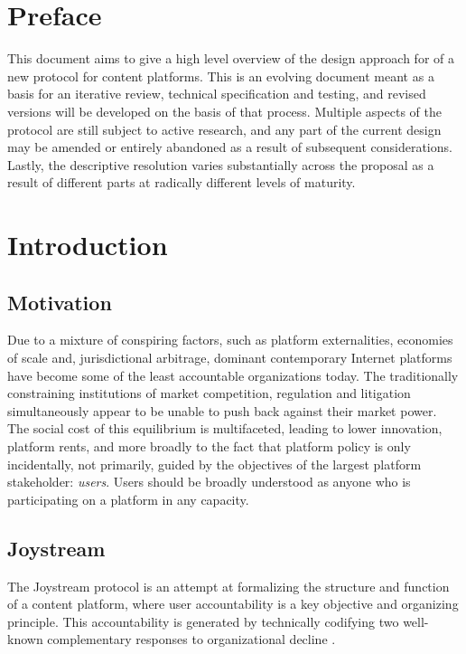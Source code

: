 \documentclass{article}
\begin{document}

\tableofcontents

\section{Preface}

This document aims to give a high level overview of the design approach for of a new protocol for content platforms. This is an evolving document meant as a basis for an iterative review, technical specification and testing, and revised versions will be developed on the basis of that process. Multiple aspects of the protocol are still subject to active research, and any part of the current design may be amended or entirely abandoned as a result of subsequent considerations. Lastly, the descriptive resolution varies substantially across the proposal as a result of different parts at radically different levels of maturity.

\section{Introduction}

\subsection{Motivation}

Due to a mixture of conspiring factors, such as platform externalities, economies of scale and, jurisdictional arbitrage, dominant contemporary Internet platforms have become some of the least accountable organizations today. The traditionally constraining institutions of market competition, regulation and litigation simultaneously appear to be unable to push back against their market power. The social cost of this equilibrium is multifaceted, leading to lower innovation, platform rents, and more broadly to the fact that platform policy is only incidentally, not primarily, guided by the objectives of the largest platform stakeholder: \textit{users}. Users should be broadly understood as anyone who is participating on a platform in any capacity.

\subsection{Joystream}

The Joystream protocol is an attempt at formalizing the structure and function of a content platform, where user accountability is a key objective and organizing principle. This accountability is generated by technically codifying two well-known complementary responses to organizational decline \cite{hirschman1970exit}.
\end{document}
